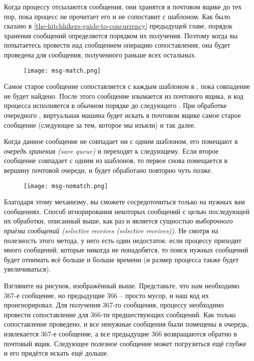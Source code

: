 Когда процессу отсылаются сообщения, они хранятся в почтовом ящике до тех пор, пока процесс не прочитает его и не сопоставит с шаблоном.
Как было сказано в \ref{the-hitchhikers-guide-to-concurrency} предыдущей главе, порядок хранения сообщений определяется  порядком их получения.
Поэтому когда вы попытаетесь провести над сообщением операцию сопоставления, она будет проведена для сообщения, полученного раньше всех остальных.
\begin{figure}[h!]
    \centering
    \texttt{[image: msg-match.png]}
\end{figure}

Самое старое сообщение сопоставляется с каждым шаблоном в , пока совпадение не будет найдено.
После этого сообщение изымается из почтового ящика, и код процесса исполняется в обычном порядке до следующего .
При обработке очередного , виртуальная машина будет искать в почтовом ящике самое старое сообщение (следующее за тем, которое мы изъяли) и так далее.

Когда данное сообщение не совпадает ни с одним шаблоном, его помещают в \emph{очередь хранения (save queue)} и переходят к следующему.
Если второе сообщение совпадает с одним из шаблонов, то первое снова помещается в вершину почтовой очереди, и будет обработано повторно чуть позже.
\begin{figure}[h!]
    \centering
    \texttt{[image: msg-nomatch.png]}
\end{figure}

Благодаря этому механизму, вы сможете сосредоточиться только на нужных вам сообщениях.
Способ игнорирования некоторых сообщений с целью последующей их обработки, описанный выше, как раз и является сущностью \emph{выборочного приёма сообщений (selective receives (selective receives))}.
Не смотря на полезность этого метода, у него есть один недостаток: если процессу приходит много сообщений, которые никогда не понадобятся, то поиск нужных сообщений будет отнимать всё больше и больше времени (и размер процесса также будет увеличиваться).

Взгляните на рисунок, изображённый выше.
Представьте, что нам необходимо 367\--е сообщение, но предыдущие 366 \--- просто мусор, и наш код их проигнорировал.
Для получения 367\--го сообщения, процессу необходимо провести сопоставление для 366\--ти предшествующих сообщений.
Как только сопоставление проведено, и все ненужные сообщения были помещены в очередь, извлекается 367\--е сообщение, а все предыдущие 366 возвращаются обратно в почтовый ящик.
Следующее полезное сообщение может погрузиться ещё глубже и его придётся искать ещё дольше.

